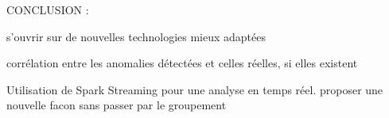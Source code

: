 CONCLUSION : 

s'ouvrir sur de nouvelles technologies mieux adaptées

corrélation entre les anomalies détectées et celles réelles, si elles existent

Utilisation de Spark Streaming pour une analyse en temps réel.
proposer une nouvelle facon sans passer par le groupement